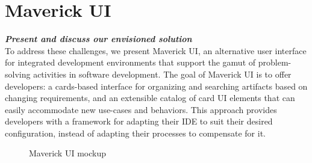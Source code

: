 \documentclass{ppig}
\newcommand{\bold}[1]{\textit{\textbf{\color{aoblue}#1}}}
\begin{document}
\section{Maverick UI}
\bold{Present and discuss our envisioned solution\\}
To address these challenges, we present Maverick UI, an alternative user interface for integrated development environments that support the gamut of problem-solving activities in software development.
The goal of Maverick UI is to offer developers: a cards-based interface for organizing and searching artifacts based on changing requirements, and an extensible catalog of card UI elements that can easily accommodate new use-cases and behaviors.
This approach provides developers with a framework for adapting their IDE to suit their desired configuration, instead of adapting their processes to compensate for it.
\begin{figure}[h!]
	\caption{Maverick UI mockup}
	\label{mockup}
	\vspace*{-1.5\baselineskip}
\end{figure}
\end{document}
